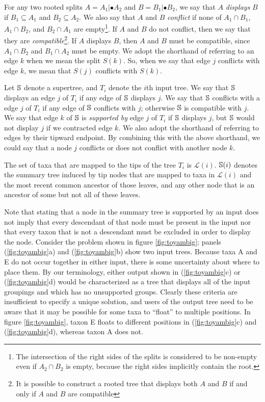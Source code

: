 \documentclass[fleqn,12pt,lineno,english]{wlpeerj}
\begin{document}
For any two rooted splits $A=A_{1}|\bullet A_{2}$ and $B=B_{1}|\bullet B_{2}$,
we say that $A$ \emph{displays} $B$ if $B_{1}\subseteq A_{1}$ and
$B_{2}\subseteq A_{2}$. We also say that $A$ and $B$ \emph{conflict}
if none of $A_{1}\cap B_{1}$, $A_{1}\cap B_{2}$, and $B_{2}\cap A_{1}$
are empty\footnote{The intersection of the right sides of the splits is considered to
be non-empty even if $A_{2}\cap B_{2}$ is empty, because the right
sides implicitly contain the root.}. If $A$ and $B$ do not conflict, then we say that they are \emph{compatible}\footnote{It is possible to construct a rooted tree that displays both $A$
and $B$ if and only if $A$ and $B$ are compatible}. If $A$ displays $B$, then $A$ and $B$ must be compatible, since
$A_{1}\cap B_{2}$ and $B_{1}\cap A_{2}$ must be empty. We adopt
the shorthand of referring to an edge $k$ when we mean the split
$S(k)$. So, when we say that edge $j$ conflicts with edge $k$,
we mean that $S(j)$ conflicts with $S(k)$. 

Let $\mathbb{S}$ denote a supertree, and $T_{i}$ denote the $i$th
input tree. We say that $\mathbb{S}$ displays an edge $j$ of $T_{i}$
if any edge of $\mathbb{S}$ displays $j$. We say that $\mathbb{S}$
conflicts with a edge $j$ of $T_{i}$ if any edge of $\mathbb{S}$
conflicts with $j$; otherwise $\mathbb{S}$ is compatible with
$j$. We say that edge $k$ of $\mathbb{S}$ is \emph{supported
by} edge $j$ of $T_{i}$ if $\mathbb{S}$ displays $j$, but $\mathbb{S}$
would not display $j$ if we contracted edge $k$. We also adopt the
shorthand of referring to edges by their tipward endpoint. By combining
this with the above shorthand, we could say that a node $j$ conflicts
or does not conflict with another node $k$.

The set of taxa that are mapped to the tips of the tree $T_{i}$ is
$\mathcal{L}(i)$. $\mathbb{S}(i)$ denotes the summary tree induced
by tip nodes that are mapped to taxa in $\mathcal{L}(i)$ and the
most recent common ancestor of those leaves, and any other node that
is an ancestor of some but not all of these leaves. 

Note that stating that a node in the summary tree is supported by
an input does not imply that every descendant of that node must be
present in the input nor that every taxon that is not a descendant
must be excluded in order to display the node. Consider the problem
shown in figure \ref{fig:toyambig}; panels (\ref{fig:toyambig}a)
and (\ref{fig:toyambig}b) show two input trees. Because taxa A and
E do not occur together in either input, there is some uncertainty
about where to place them. By our terminology, either output shown
in (\ref{fig:toyambig}c) or (\ref{fig:toyambig}d) would be characterized
as a tree that displays all of the input groupings and which has no
unsupported groups. Clearly these criteria are insufficient to specify
a unique solution, and users of the output tree need to be aware that
it may be possible for some taxa to ``float'' to multiple positions.
In figure \ref{fig:toyambig}, taxon E floats to different positions
in (\ref{fig:toyambig}c) and (\ref{fig:toyambig}d), whereas taxon
A does not. 
\end{document}

